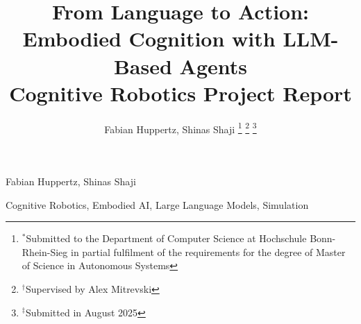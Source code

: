 \documentclass[lettersize,journal]{IEEEtran}
\begin{document}
\title{From Language to Action: Embodied Cognition with LLM-Based Agents \\ \small Cognitive Robotics Project Report}

\author{Fabian Huppertz, Shinas Shaji
	\thanks{$^*$Submitted to the Department of Computer Science at Hochschule Bonn-Rhein-Sieg in partial fulfilment of the requirements for the degree of Master of Science in Autonomous Systems}
	\thanks{$^{\dagger}$Supervised by Alex Mitrevski}
	\thanks{$^{\ddagger}$Submitted in August 2025}} %

%
{Fabian Huppertz, Shinas Shaji}

\maketitle



\begin{IEEEkeywords}
	Cognitive Robotics, Embodied AI, Large Language Models, Simulation
\end{IEEEkeywords}














\end{document}
